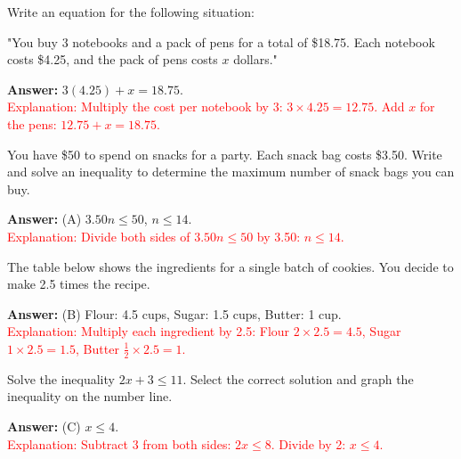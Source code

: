 \documentclass[12pt]{article}
\begin{document}
\begin{tcolorbox}[colframe=black!50, colback=white, title=\textbf{Problem 7 (7.EE.B.4)}]
Write an equation for the following situation:

"You buy 3 notebooks and a pack of pens for a total of \$18.75. Each notebook costs \$4.25, and the pack of pens costs \(x\) dollars."

\textbf{Answer:} \(3(4.25) + x = 18.75\).\\
\textcolor{red}{Explanation: Multiply the cost per notebook by 3: \(3 \times 4.25 = 12.75\). Add \(x\) for the pens: \(12.75 + x = 18.75\).}
\end{tcolorbox}

\begin{tcolorbox}[colframe=black!50, colback=white, title=\textbf{Problem 8 (7.EE.B.4)}]
You have \$50 to spend on snacks for a party. Each snack bag costs \$3.50. Write and solve an inequality to determine the maximum number of snack bags you can buy.

\textbf{Answer:} (A) \(3.50n \leq 50\), \(n \leq 14\).\\
\textcolor{red}{Explanation: Divide both sides of \(3.50n \leq 50\) by 3.50: \(n \leq 14\).}
\end{tcolorbox}

\begin{tcolorbox}[colframe=black!50, colback=white, title=\textbf{Problem 9 (7.RP.A.3)}]
The table below shows the ingredients for a single batch of cookies. You decide to make 2.5 times the recipe. 

\textbf{Answer:} (B) Flour: 4.5 cups, Sugar: 1.5 cups, Butter: 1 cup.\\
\textcolor{red}{Explanation: Multiply each ingredient by 2.5: Flour \(2 \times 2.5 = 4.5\), Sugar \(1 \times 2.5 = 1.5\), Butter \(\frac{1}{2} \times 2.5 = 1\).}
\end{tcolorbox}

\begin{tcolorbox}[colframe=black!50, colback=white, title=\textbf{Problem 10 (7.EE.B.4)}]
Solve the inequality \(2x + 3 \leq 11\). Select the correct solution and graph the inequality on the number line.

\textbf{Answer:} (C) \(x \leq 4\).\\
\textcolor{red}{Explanation: Subtract 3 from both sides: \(2x \leq 8\). Divide by 2: \(x \leq 4\).}
\end{tcolorbox}
\end{document}
